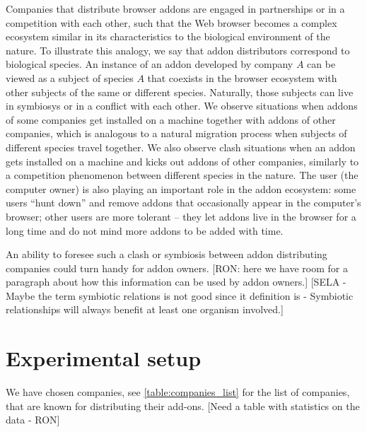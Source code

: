 \documentclass[11pt,oneside]{book}
\let\Oldsection\section
\renewcommand{\section}{\FloatBarrier\Oldsection}
\begin{document}
Companies that distribute browser addons are engaged in partnerships or in a competition with each other, such that the Web browser becomes a complex ecosystem similar in its characteristics to the biological environment of the nature. To illustrate this analogy, we say that addon distributors correspond to biological species. An instance of an addon developed by company $A$ can be viewed as a subject of species $A$ that coexists in the browser ecosystem with other subjects of the same or different species. Naturally, those subjects can live in symbiosys or in a conflict with each other. We observe situations when addons of some companies get installed on a machine together with addons of other companies, which is analogous to a natural migration process when subjects of different species travel together. We also observe clash situations when an addon gets installed on a machine and kicks out addons of other companies, similarly to a competition phenomenon between different species in the nature. The user (the computer owner) is also playing an important role in the addon ecosystem: some users ``hunt down'' and remove addons that occasionally appear in the computer's browser; other users are more tolerant -- they let addons live in the browser for a long time and do not mind more addons to be added with time.

An ability to foresee such a clash or symbiosis between addon distributing companies could turn handy for addon owners. [RON: here we have room for a paragraph about how this information can be used by addon owners.]
[SELA - Maybe the term symbiotic relations is not good since it definition is  - Symbiotic relationships will always benefit at least one organism involved.]

\section{Experimental setup}
We have chosen companies, see \autoref{table:companies_list} for the list of companies, that are known for distributing their add-ons. [Need a table with statistics on the data - RON]
\end{document}
